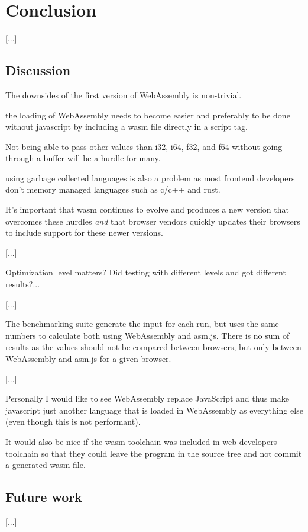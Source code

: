 \section{Conclusion}
\label{conclusion}

[...]

\subsection{Discussion}

The downsides of the first version of WebAssembly is non-trivial.

the loading of WebAssembly needs to become easier and preferably to be done without javascript by including a wasm file directly in a script tag.

Not being able to pass other values than i32, i64, f32, and f64 without going through a buffer will be a hurdle for many.

using garbage collected languages is also a problem as most frontend developers don't memory managed languages such as c/c++ and rust.

It's important that wasm continues to evolve and produces a new version that overcomes these hurdles \emph{and} that browser vendors quickly updates their browsers to include support for these newer versions.

[...]

Optimization level matters? Did testing with different levels and got different results?...

[...]

The benchmarking suite generate the input for each run, but uses the same numbers to calculate both using WebAssembly and asm.js. There is no sum of results as the values should not be compared between browsers, but only between WebAssembly and asm.js for a given browser.

[...]

Personally I would like to see WebAssembly replace JavaScript and thus make javascript just another language that is loaded in WebAssembly as everything else (even though this is not performant).

It would also be nice if the wasm toolchain was included in web developers toolchain so that they could leave the program in the source tree and not commit a generated wasm-file.

\subsection{Future work}

[...]
